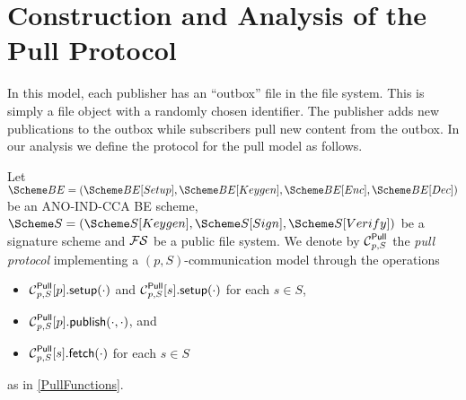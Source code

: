 \section{Construction and Analysis of the Pull Protocol}
\label{PullAnalysis}

In this model, each publisher has an \enquote{outbox} file in the file system.
This is simply a file object with a randomly chosen identifier.
The publisher adds new publications to the outbox while subscribers pull new 
content from the outbox.
In our analysis we define the protocol for the pull model as follows.

\begin{definition}\label{PullModel}
  Let \(\BE = (\BE[Setup], \BE[Keygen], \BE[Enc], \BE[Dec])\) be an ANO-IND-CCA 
  \ac{BE} scheme,
  \(\S = (\S[Keygen], \S[Sign], \S[Verify])\) be a signature scheme and \(\FS\) 
  be a public file system.
  We denote by \(\Pull[p, S]\) the \emph{pull protocol} implementing a \((p, 
    S)\)-communication model through the operations
  \begin{itemize}
    \item \(\psetup[p, S]{p}[\cdot]\) and \(\psetup[p, S]{s}[\cdot]\) for each
      \(s\in S\),
    \item \(\ppub[p, S]{p}[\cdot][\cdot]\), and
    \item \(\pget[p, S]{s}[\cdot]\) for each \(s\in S\)
  \end{itemize}
  as in \cref{PullFunctions}.
\end{definition}

